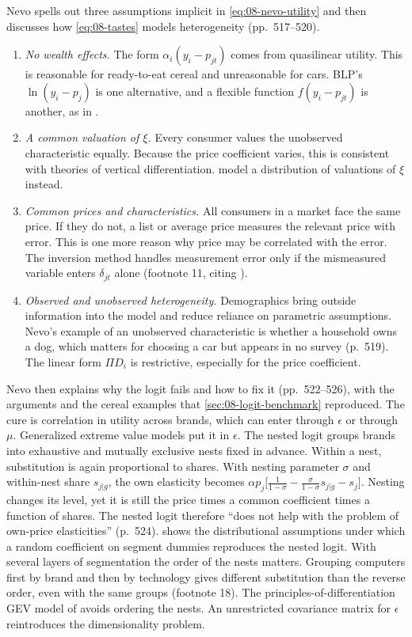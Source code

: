 Nevo spells out three assumptions implicit in \eqref{eq:08-nevo-utility} and then discusses how
\eqref{eq:08-tastes} models heterogeneity (pp.~517--520).
\begin{enumerate}
\item \emph{No wealth effects.} The form $\alpha_i(y_i-p_{jt})$ comes from quasilinear utility. This is
  reasonable for ready-to-eat cereal and unreasonable for cars. BLP's $\ln(y_i-p_j)$ is one alternative,
  and a flexible function $f(y_i-p_{jt})$ is another, as in \citet{Petrin2002}.
\item \emph{A common valuation of $\xi$.} Every consumer values the unobserved characteristic equally.
  Because the price coefficient varies, this is consistent with theories of vertical differentiation.
  \citet{DasOlleyPakes1994} model a distribution of valuations of $\xi$ instead.
\item \emph{Common prices and characteristics.} All consumers in a market face the same price. If they
  do not, a list or average price measures the relevant price with error. This is one more reason why
  price may be correlated with the error. The inversion method handles measurement error only if the
  mismeasured variable enters $\delta_{jt}$ alone (footnote 11, citing \citealp{Berry1994}).
\item \emph{Observed and unobserved heterogeneity.} Demographics bring outside information into the
  model and reduce reliance on parametric assumptions. Nevo's example of an unobserved characteristic is
  whether a household owns a dog, which matters for choosing a car but appears in no survey (p.~519). The
  linear form $\Pi D_i$ is restrictive, especially for the price coefficient.
\end{enumerate}

Nevo then explains why the logit fails and how to fix it (pp.~522--526), with the arguments and the cereal
examples that \cref{sec:08-logit-benchmark} reproduced. The cure is correlation in utility across brands, which
can enter through $\epsilon$ or through $\mu$.
Generalized extreme value models put it in $\epsilon$. The nested logit groups brands into exhaustive and
mutually exclusive nests fixed in advance. Within a nest, substitution is again proportional to shares.
With nesting parameter $\sigma$ and within-nest share $s_{j|g}$, the own elasticity becomes $\alpha
p_j\bigl[\frac{1}{1-\sigma}-\frac{\sigma}{1-\sigma}s_{j|g}-s_j\bigr]$. Nesting changes its level, yet it is
still the price times a common coefficient times a function of shares. The nested logit therefore ``does
not help with the problem of own-price elasticities'' (p.~524). \citet{Cardell1997} shows the distributional assumptions
under which a random coefficient on segment dummies reproduces the nested logit. With several layers of
segmentation the order of the nests matters. Grouping computers first by brand and then by technology
gives different substitution than the reverse order, even with the same groups (footnote 18). The
principles-of-differentiation GEV model of \citet{BresnahanSternTrajtenberg1997} avoids ordering the
nests. An unrestricted covariance matrix for $\epsilon$ reintroduces the dimensionality problem.

